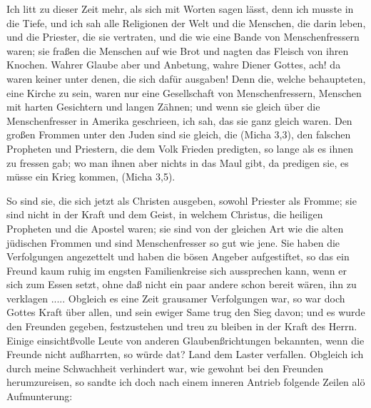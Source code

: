 Ich litt zu dieser Zeit mehr, als sich mit Worten sagen lässt,
denn ich musste in die Tiefe, und ich sah alle Religionen der Welt
und die Menschen, die darin leben, und die Priester, die sie vertraten, 
und die wie eine Bande von Menschenfressern waren; sie
fraßen die Menschen auf wie Brot und nagten das Fleisch von
ihren Knochen. Wahrer Glaube aber und Anbetung, wahre
Diener Gottes, ach! da waren keiner unter denen, die sich dafür
ausgaben! Denn die, welche behaupteten, eine Kirche zu sein,
waren nur eine Gesellschaft von Menschenfressern, Menschen mit
harten Gesichtern und langen Zähnen; und wenn sie gleich über
die Menschenfresser in Amerika geschrieen, ich sah, das sie ganz
gleich waren. Den großen Frommen unter den Juden sind sie
gleich, die  (Micha 3,3), den
falschen Propheten und Priestern, die dem Volk Frieden predigten,
so lange als es ihnen zu fressen gab; wo man ihnen aber
nichts in das Maul gibt, da predigen sie, es müsse ein Krieg
kommen,  (Micha 3,5).

So sind sie, die sich jetzt als Christen ausgeben, sowohl
Priester als Fromme; sie sind nicht in der Kraft und dem Geist,
in welchem Christus, die heiligen Propheten und die Apostel
waren; sie sind von der gleichen Art wie die alten jüdischen
Frommen und sind Menschenfresser so gut wie jene. Sie haben
die Verfolgungen angezettelt und haben die bösen Angeber 
aufgestiftet, so das ein Freund kaum ruhig im engsten Familienkreise
sich aussprechen kann, wenn er sich zum Essen setzt, ohne daß
nicht ein paar andere schon bereit wären, ihn zu verklagen .....
Obgleich es eine Zeit grausamer Verfolgungen war, so war
doch Gottes Kraft über allen, und sein ewiger Same trug den Sieg
davon; und es wurde den Freunden gegeben, festzustehen und treu
zu bleiben in der Kraft des Herrn. Einige einsichtßvolle Leute
von anderen Glaubenßrichtungen bekannten, wenn die Freunde
nicht außharrten, so würde dat? Land dem Laster verfallen.
Obgleich ich durch meine Schwachheit verhindert war, wie
gewohnt bei den Freunden herumzureisen, so sandte ich doch nach
einem inneren Antrieb folgende Zeilen alö Aufmunterung:


